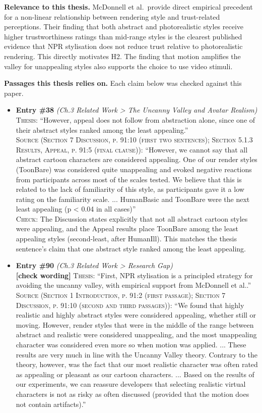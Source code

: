\documentclass[11pt, a4paper]{article}
\begin{document}
\textbf{Relevance to this thesis.} McDonnell et al.\ provide direct empirical precedent for a non-linear relationship between rendering style and trust-related perceptions. Their finding that both abstract and photorealistic styles receive higher trustworthiness ratings than mid-range styles is the clearest published evidence that NPR stylisation does not reduce trust relative to photorealistic rendering. This directly motivates H2. The finding that motion amplifies the valley for unappealing styles also supports the choice to use video stimuli.


\textbf{Passages this thesis relies on.} Each claim below was checked against this paper.
\begin{itemize}[leftmargin=1.2em,itemsep=4pt]
\item \textbf{Entry \#38} \textit{(Ch.3 Related Work > The Uncanny Valley and Avatar Realism)}\\
\textsc{Thesis:} ``However, appeal does not follow from abstraction alone, since one of their abstract styles ranked among the least appealing.''\\
\textsc{Source (Section 7 Discussion, p. 91:10 (first two sentences); Section 5.1.3 Results, Appeal, p. 91:5 (final clause)):} ``However, we cannot say that all abstract cartoon characters are considered appealing. One of our render styles (ToonBare) was considered quite unappealing and evoked negative reactions from participants across most of the scales tested. We believe that this is related to the lack of familiarity of this style, as participants gave it a low rating on the familiarity scale. ... HumanBasic and ToonBare were the next least appealing (p < 0.04 in all cases)''\\
\textsc{Check:} The Discussion states explicitly that not all abstract cartoon styles were appealing, and the Appeal results place ToonBare among the least appealing styles (second-least, after HumanIll). This matches the thesis sentence's claim that one abstract style ranked among the least appealing.
\item \textbf{Entry \#90} \textit{(Ch.3 Related Work > Research Gap)}\\
\textcolor{partialorange}{\textbf{[check wording]}} \textsc{Thesis:} ``First, NPR stylisation is a principled strategy for avoiding the uncanny valley, with empirical support from McDonnell et al..''\\
\textsc{Source (Section 1 Introduction, p. 91:2 (first passage); Section 7 Discussion, p. 91:10 (second and third passages)):} ``We found that highly realistic and highly abstract styles were considered appealing, whether still or moving. However, render styles that were in the middle of the range between abstract and realistic were considered unappealing, and the most unappealing character was considered even more so when motion was applied. ... These results are very much in line with the Uncanny Valley theory. Contrary to the theory, however, was the fact that our most realistic character was often rated as appealing or pleasant as our cartoon characters. ... Based on the results of our experiments, we can reassure developers that selecting realistic virtual characters is not as risky as often discussed (provided that the motion does not contain artifacts).''\\

\end{itemize}
\end{document}
